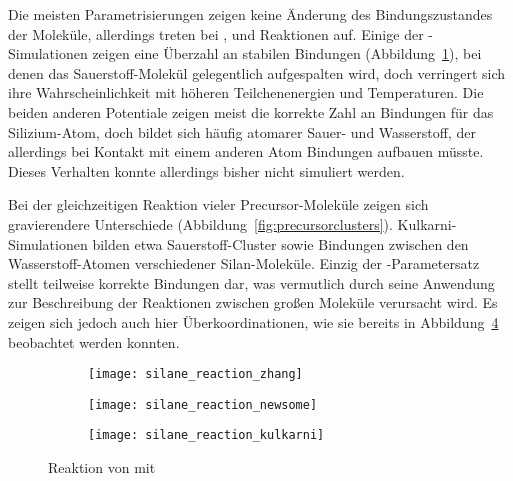 Die meisten Parametrisierungen zeigen keine Änderung des Bindungszustandes der Moleküle, allerdings treten bei ,  und  Reaktionen auf.
Einige der -Simulationen zeigen eine Überzahl an stabilen Bindungen (Abbildung~\ref{fig:zhangreaction}), bei denen das Sauerstoff-Molekül gelegentlich aufgespalten wird, doch verringert sich ihre Wahrscheinlichkeit mit höheren Teilchenenergien und Temperaturen.
Die beiden anderen Potentiale zeigen meist die korrekte Zahl an Bindungen für das Silizium-Atom, doch bildet sich häufig atomarer Sauer- und Wasserstoff, der allerdings bei Kontakt mit einem anderen Atom Bindungen aufbauen müsste.
Dieses Verhalten konnte allerdings bisher nicht simuliert werden.

Bei der gleichzeitigen Reaktion vieler Precursor-Moleküle zeigen sich gravierendere Unterschiede (Abbildung~\ref{fig:precursorclusters}).
Kulkarni-Simulationen bilden etwa Sauerstoff-Cluster sowie Bindungen zwischen den Wasserstoff-Atomen verschiedener Silan-Moleküle.
Einzig der -Parametersatz stellt teilweise korrekte Bindungen dar, was vermutlich durch seine Anwendung zur Beschreibung der Reaktionen zwischen großen Moleküle verursacht wird.
Es zeigen sich jedoch auch hier Überkoordinationen, wie sie bereits in Abbildung~\ref{fig:precursorreactions} beobachtet werden konnten.

\begin{figure}[p]

  \captionsetup[subfigure]{singlelinecheck=false}
  \def\subfigwidth{0.32\textwidth}
  \begin{subfigure}[t]{3cm}
    \texttt{[image: silane\_reaction\_zhang]}
    \label{fig:zhangreaction}
  \end{subfigure}
  \hfill
  \begin{subfigure}[t]{5cm}
    \texttt{[image: silane\_reaction\_newsome]}
    \label{fig:newsomereaction}
  \end{subfigure}
  \hfill
  \begin{subfigure}[t]{4.5cm}
    \texttt{[image: silane\_reaction\_kulkarni]}
    \label{fig:kulkarnireaction}
  \end{subfigure}

  \caption[Reaktionen von  mit ]{
    Reaktion von  mit 
  }
  \label{fig:precursorreactions}

\end{figure}


